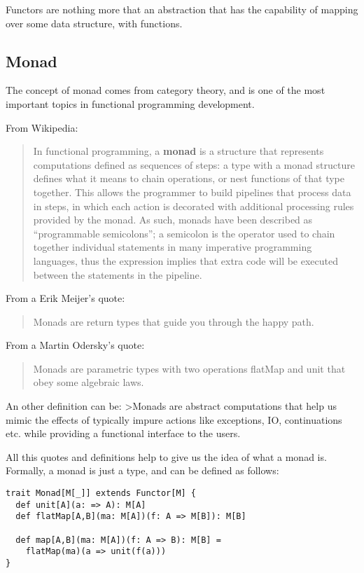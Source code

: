 Functors are nothing more that an abstraction that has the capability of
mapping over some data structure, with functions.

\subsection{Monad}\label{monad}

The concept of monad comes from category theory, and is one of the most
important topics in functional programming development.

From Wikipedia:

\begin{quote}
In functional programming, a \textbf{monad} is a structure that
represents computations defined as sequences of steps: a type with a
monad structure defines what it means to chain operations, or nest
functions of that type together. This allows the programmer to build
pipelines that process data in steps, in which each action is decorated
with additional processing rules provided by the monad. As such, monads
have been described as ``programmable semicolons''; a semicolon is the
operator used to chain together individual statements in many imperative
programming languages, thus the expression implies that extra code will
be executed between the statements in the pipeline.
\end{quote}

From a Erik Meijer's quote:

\begin{quote}
Monads are return types that guide you through the happy path.
\end{quote}

From a Martin Odersky's quote:

\begin{quote}
Monads are parametric types with two operations flatMap and unit that
obey some algebraic laws.
\end{quote}

An other definition can be: \textgreater{}Monads are abstract
computations that help us mimic the effects of typically impure actions
like exceptions, IO, continuations etc. while providing a functional
interface to the users.

All this quotes and definitions help to give us the idea of what a monad
is. Formally, a monad is just a type, and can be defined as follows:

\begin{verbatim}
trait Monad[M[_]] extends Functor[M] {
  def unit[A](a: => A): M[A]
  def flatMap[A,B](ma: M[A])(f: A => M[B]): M[B]

  def map[A,B](ma: M[A])(f: A => B): M[B] =
    flatMap(ma)(a => unit(f(a)))
}
\end{verbatim}

